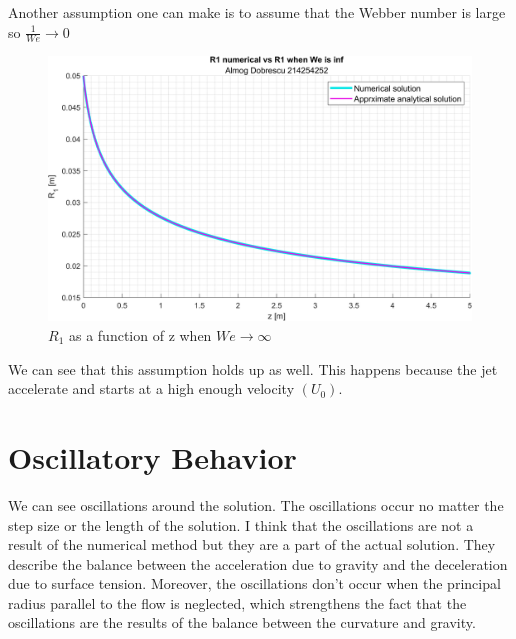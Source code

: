 \documentclass[11pt, a4paper]{article}
\begin{document}
Another assumption one can make is to assume that the Webber number is large so $\frac{1}{We}\rightarrow0$
\begin{figure}[H]
    \centering
    \includegraphics[width=1\textwidth]{images/graph4.png}
    \caption{$R_1$ as a function of z when $We\rightarrow\infty$}
    \label{fig:R_1_of_z_when_We_inf}
\end{figure}
\noindent We can see that this assumption holds up as well. This happens because the jet accelerate and starts at a high enough velocity $\left(U_0\right)$.

\newpage

\section{Oscillatory Behavior}
We can see oscillations around the solution. The oscillations occur no matter the step size or the length of the solution. I think that the oscillations are not a result of the numerical method but they are a part of the actual solution. They describe the balance between the acceleration due to gravity and the deceleration due to surface tension. Moreover, the oscillations don't occur when the principal radius parallel to the flow is neglected, which strengthens the fact that the oscillations are the results of the balance between the curvature and gravity.

\newpage

\appendix
\end{document}
